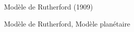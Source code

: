 \documentclass[handout,8pt]{beamer} %
\begin{document}
\begin{frame}{Modèle de Rutherford (1909)}
\begin{block}{Modèle de Rutherford, Modèle planétaire}
                                                                                                                                                                                                                                                                                                                                                                                                                                                                                                                                                                                                                                                                                                                                                                                                                                                                                                                                                                                                                                                                                                                                                                                                                                                                                                                                                                                                                                                                                                                                                                                                                                                                                                                                                                                                                                                                                                                                                                                                                                                                                                                                                                                                                                                                                                                                                                                                                                                                                                                                                                                                                                                                                                                                                                                                                                                                                                                                                                                                                                                                                                                                                                                                                                                                                                                                                                      
\end{block}
\end{frame}
\end{document}
